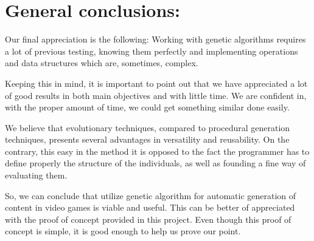 \section{General conclusions:}
Our final appreciation is the following: Working with genetic algorithms requires a lot of previous testing, knowing them perfectly and implementing operations and data structures which are, sometimes, complex.\par
Keeping this in mind, it is important to point out that we have appreciated a lot of good results in both main objectives and with little time. We are confident in, with the proper amount of time, we could get something similar done easily.\par
We believe that evolutionary techniques, compared to procedural generation techniques, presents several advantages in versatility and reusability. On the contrary, this easy in the method it is opposed to the fact the programmer has to define properly the structure of the individuals, as well as founding a fine way of evaluating them. \par
So, we can conclude that utilize genetic algorithm for automatic generation of content in video games is viable and useful. This can be better of appreciated with the proof of concept provided in this project. Even though this proof of concept is simple, it is good enough to help us prove our point.\par
